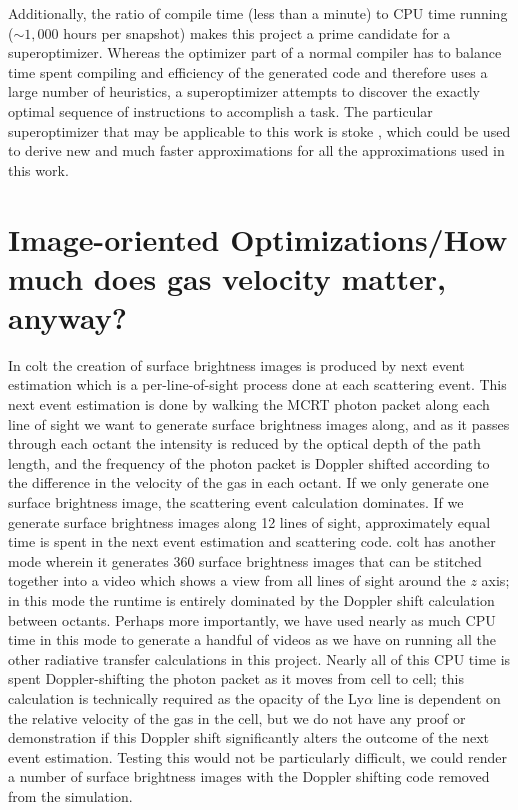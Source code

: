 Additionally, the ratio of compile time (less than a minute) to CPU time running ($\sim1,000$ hours per snapshot) makes this project a prime candidate for a superoptimizer.
Whereas the optimizer part of a normal compiler has to balance time spent compiling and efficiency of the generated code and therefore uses a large number of heuristics, a superoptimizer attempts to discover the exactly optimal sequence of instructions to accomplish a task.
The particular superoptimizer that may be applicable to this work is {\sc stoke} \citep{stoke}, which could be used to derive new and much faster approximations for all the approximations used in this work.


\section{Image-oriented Optimizations/How much does gas velocity matter, anyway?}
In {\sc colt} the creation of surface brightness images is produced by next event estimation which is a per-line-of-sight process done at each scattering event.
This next event estimation is done by walking the MCRT photon packet along each line of sight we want to generate surface brightness images along, and as it passes through each octant the intensity is reduced by the optical depth of the path length, and the frequency of the photon packet is Doppler shifted according to the difference in the velocity of the gas in each octant.
If we only generate one surface brightness image, the scattering event calculation dominates.
If we generate surface brightness images along 12 lines of sight, approximately equal time is spent in the next event estimation and scattering code.
{\sc colt} has another mode wherein it generates 360 surface brightness images that can be stitched together into a video which shows a view from all lines of sight around the $z$ axis; in this mode the runtime is entirely dominated by the Doppler shift calculation between octants.
Perhaps more importantly, we have used nearly as much CPU time in this mode to generate a handful of videos as we have on running all the other radiative transfer calculations in this project.
Nearly all of this CPU time is spent Doppler-shifting the photon packet as it moves from cell to cell; this calculation is technically required as the opacity of the Ly$\alpha$ line is dependent on the relative velocity of the gas in the cell, but we do not have any proof or demonstration if this Doppler shift significantly alters the outcome of the next event estimation.
Testing this would not be particularly difficult, we could render a number of surface brightness images with the Doppler shifting code removed from the simulation.

